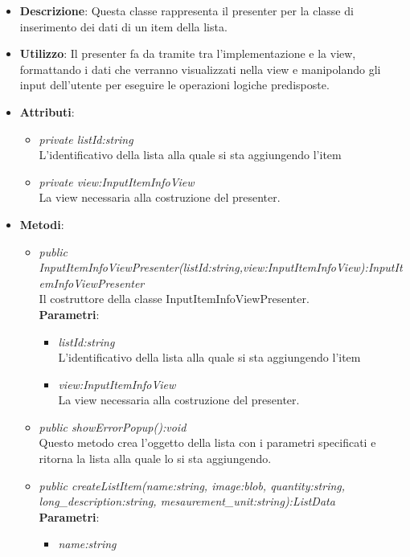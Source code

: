 \begin{itemize}
\item \textbf{Descrizione}: Questa classe rappresenta il presenter per la classe di inserimento dei dati di un item della lista.
\item \textbf{Utilizzo}: Il presenter fa da tramite tra l'implementazione e la view, formattando i dati che verranno visualizzati nella view e manipolando gli input dell'utente per eseguire le operazioni logiche predisposte.
\item \textbf{Attributi}: 
	\begin{itemize}
	\item \textit{private listId:string}\\
	L'identificativo della lista alla quale si sta aggiungendo l'item
	\item \textit{private view:InputItemInfoView}\\
	La view necessaria alla costruzione del presenter.
	\end{itemize}
\item \textbf{Metodi}:
	\begin{itemize}
	\item \textit{public InputItemInfoViewPresenter(listId:string,view:InputItemInfoView):InputItemInfoViewPresenter}\\
	Il costruttore della classe InputItemInfoViewPresenter.
					\\ \textbf{Parametri}: \begin{itemize}
			\item \textit{listId:string}\\
			L'identificativo della lista alla quale si sta aggiungendo l'item
			\item \textit{view:InputItemInfoView}\\
			La view necessaria alla costruzione del presenter.
					\end{itemize} 
	\item \textit{public showErrorPopup():void}\\
	Questo metodo crea l'oggetto della lista con i parametri specificati e ritorna la lista alla quale lo si sta aggiungendo.
	\item \textit{public createListItem(name:string, image:blob, quantity:string, long\_description:string, mesaurement\_unit:string):ListData}
						\\ \textbf{Parametri}: \begin{itemize}
			\item \textit{name:string}\\

\end{itemize}
\end{itemize}
\end{itemize}
